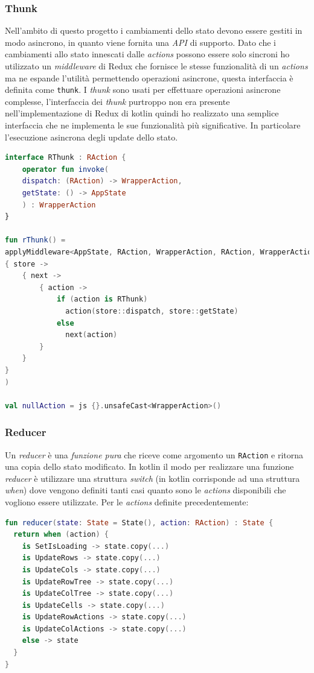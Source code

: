 \subsubsection*{Thunk}
Nell'ambito di questo progetto i cambiamenti dello stato devono essere gestiti in modo asincrono, in quanto viene fornita una \emph{API} di supporto. Dato che i cambiamenti allo stato innescati dalle \emph{actions} possono essere solo sincroni ho utilizzato un \emph{middleware} di Redux che fornisce le stesse funzionalità di un \emph{actions} ma ne espande l'utilità permettendo operazioni asincrone, questa interfaccia è definita come \verb|thunk|.
I \emph{thunk} sono usati per effettuare operazioni asincrone complesse, l'interfaccia dei \emph{thunk} purtroppo non era presente nell'implementazione di Redux di kotlin quindi ho realizzato una semplice interfaccia che ne implementa le sue funzionalità più significative. In particolare l'esecuzione asincrona degli update dello stato.
\begin{lstlisting}[caption={Interfaccia Thunk}, label={lst:thunk_interface}, language=Kotlin]
interface RThunk : RAction {
	operator fun invoke(
	dispatch: (RAction) -> WrapperAction,
	getState: () -> AppState
	) : WrapperAction
}

fun rThunk() =
applyMiddleware<AppState, RAction, WrapperAction, RAction, WrapperAction>(
{ store ->
	{ next ->
		{ action ->
			if (action is RThunk)
			  action(store::dispatch, store::getState)
			else
			  next(action)
		}
	}
}
)

val nullAction = js {}.unsafeCast<WrapperAction>()
\end{lstlisting}

\subsubsection*{Reducer}
Un \emph{reducer} è una \emph{funzione pura} che riceve come argomento un \verb|RAction| e ritorna una copia dello stato modificato. In kotlin il modo per realizzare una funzione \emph{reducer} è utilizzare una struttura \emph{switch} (in kotlin corrisponde ad una struttura \emph{when}) dove vengono definiti tanti casi quanto sono le \emph{actions} disponibili che vogliono essere utilizzate. Per le \emph{actions} definite precedentemente:
\begin{lstlisting}[caption={Interfaccia Thunk}, label={lst:reducer_slice}, language=Kotlin]
fun reducer(state: State = State(), action: RAction) : State {
  return when (action) {
    is SetIsLoading -> state.copy(...)
    is UpdateRows -> state.copy(...)
    is UpdateCols -> state.copy(...)
    is UpdateRowTree -> state.copy(...)
    is UpdateColTree -> state.copy(...) 
    is UpdateCells -> state.copy(...)
    is UpdateRowActions -> state.copy(...)
    is UpdateColActions -> state.copy(...)
    else -> state
  }
}
\end{lstlisting}


